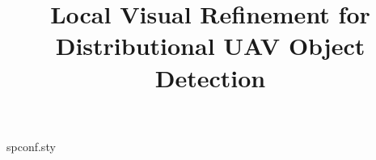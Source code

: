 \begin{filecontents*}{spconf.sty}
\def\copyrightnotice#1{\gdef\@copyrightnotice{#1}}
\let\@copyrightnotice\relax
\def\toappear#1{\gdef\@toappear{#1}}\let\@toappear\relax

\newif\if@preprint\@preprintfalse
\@namedef{ds@preprint}{\global\@preprinttrue}
\@options
\def\ps@preprint{\def\mypage{}\let\@mkboth\@gobbletwo\def\@oddhead{}
  \def\@oddfoot{\rlap{\@toappear}\hfil\mypage\hfil
    \llap{\@copyrightnotice}
    \gdef\mypage{\thepage}\gdef\@toappear{}\gdef\@copyrightnotice{}}}

\if@preprint\ps@preprint
\else\ps@empty\flushbottom\fi

\def\thebibliography#1{\section{References}\list
 {[\arabic{enumi}]}{\settowidth\labelwidth{[#1]}\leftmargin\labelwidth
 \advance\leftmargin\labelsep
 \usecounter{enumi}}
 \def\newblock{\hskip .11em plus .33em minus .07em}
 \sloppy\clubpenalty4000\widowpenalty4000
 \sfcode`\.=1000\relax}
\let\endthebibliography=\endlist

\long\def\@makecaption#1#2{
 \vskip 10pt
 \setbox\@tempboxa\hbox{#1. #2}
 \ifdim \wd\@tempboxa >\hsize #1. #2\par \else \hbox
to\hsize{\hfil\box\@tempboxa\hfil}
 \fi}

\def\fnum@figure{{\bf Fig.\ \thefigure}}
\def\fnum@table{{\bf Table \thetable}}

\flushbottom

\end{filecontents*}
\documentclass[10pt,letterpaper]{article}
\usepackage{spconf}
\usepackage[T1]{fontenc}
\usepackage[utf8]{inputenc}
\usepackage{amsmath,amssymb}
\usepackage{graphicx,booktabs,array}
\usepackage{tikz}
\usetikzlibrary{arrows.meta}
\usepackage[hidelinks]{hyperref}
\newcommand{\sg}{\operatorname{sg}}
\newcommand{\softmax}{\operatorname{softmax}}
\newcommand{\tablefont}{\fontsize{9}{11.4}\selectfont}
\setlength{\tabcolsep}{3pt}
\setlength{\textfloatsep}{12pt plus 2pt minus 2pt}
\setlength{\floatsep}{10pt plus 2pt minus 2pt}
\setlength{\dbltextfloatsep}{12pt plus 2pt minus 2pt}
\renewcommand{\arraystretch}{1.12}
\title{Local Visual Refinement for Distributional UAV Object Detection}
\name{\vphantom{Author Names}}
\address{\vphantom{Department and Institution}\\\vphantom{City and Country}}

